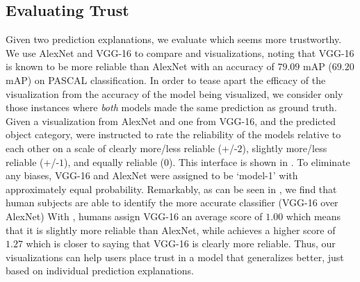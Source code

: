 \begin{table}[h!]
\vspace{-15pt}
\centering
{}
    \vspace{2pt}
    \caption{}
\label{tab:eval_vis}
\end{table}

\vspace{-15pt}
\subsection{Evaluating Trust}
Given two prediction explanations, we evaluate which seems more trustworthy.
We use AlexNet and VGG-16 to compare \gb{} and \cgb{} visualizations, noting
that VGG-16 is known to be more reliable than AlexNet with an accuracy of $79.09$ mAP
(\vs $69.20$ mAP) on PASCAL classification.
In order to tease apart the efficacy of the visualization from the accuracy of the model being visualized, we consider only those instances where \emph{both} models made the same prediction as ground truth. %
Given a visualization from AlexNet and one from VGG-16, and the predicted object category,  were instructed to rate the reliability of the models relative to each other on a scale of clearly more/less reliable (+/-$2$), slightly more/less reliable (+/-$1$), and equally reliable ($0$).
This interface is shown in .
To eliminate any biases, VGG-16 and AlexNet were assigned to be `model-1' with approximately equal probability.
Remarkably, as can be seen in , we find that human subjects are able to identify the more accurate
classifier (VGG-16 over AlexNet) \emph{}
With \gb{}, humans assign VGG-16 an average score of $1.00$ which means that it is
slightly more reliable than AlexNet, while \cgb{} achieves a higher score of $1.27$
which is closer to saying that VGG-16 is clearly more reliable.
Thus, our visualizations can help users place trust in a model that generalizes better,
just based on individual prediction explanations.




